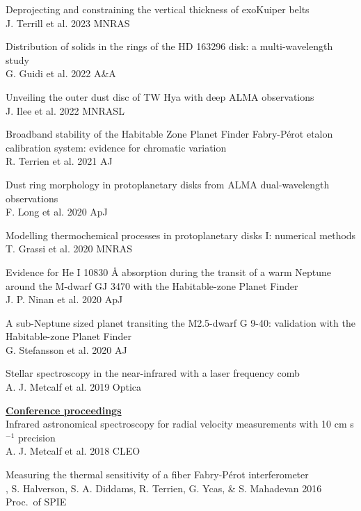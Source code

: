 \documentclass[10pt,preprint]{aastex}
\begin{document}
\noindent Deprojecting and constraining the vertical thickness of exoKuiper belts \\
\indent J. Terrill et al. 2023 MNRAS

\noindent Distribution of solids in the rings of the HD 163296 disk: a multi-wavelength study \\
\indent G. Guidi et al. 2022 A\&A 

\noindent Unveiling the outer dust disc of TW Hya with deep ALMA observations \\
\indent J. Ilee et al. 2022 MNRASL

\noindent Broadband stability of the Habitable Zone Planet Finder Fabry-P{\'e}rot etalon calibration system: evidence for chromatic variation \\
\indent R. Terrien et al. 2021 AJ 

\noindent Dust ring morphology in protoplanetary disks from ALMA dual-wavelength observations \\
\indent F. Long et al. 2020 ApJ 

\noindent Modelling thermochemical processes in protoplanetary
disks I: numerical methods \\
\indent T. Grassi et al. 2020 MNRAS

\noindent Evidence for He I 10830 \si{\angstrom} absorption during the transit of a warm Neptune around the M-dwarf GJ 3470 with the Habitable-zone Planet Finder \\
\indent J. P. Ninan et al. 2020 ApJ

\noindent A sub-Neptune sized planet transiting the M2.5-dwarf G 9-40: validation with the Habitable-zone Planet Finder \\
\indent G. Stefansson et al. 2020 AJ

\noindent Stellar spectroscopy in the near-infrared with a laser frequency comb \\
\indent A. J. Metcalf et al. 2019 Optica 

\noindent \underline{{\bf Conference proceedings}} \\

\noindent Infrared astronomical spectroscopy for radial velocity
measurements with 10 cm s$^{-1}$ precision \\
\indent A. J. Metcalf et al. 2018 CLEO

\noindent Measuring the thermal sensitivity of a fiber Fabry-P{\'e}rot interferometer \\
, S. Halverson, S. A. Diddams, R. Terrien, G. Ycas, \& S. Mahadevan 2016 Proc.~of SPIE
\end{document}
